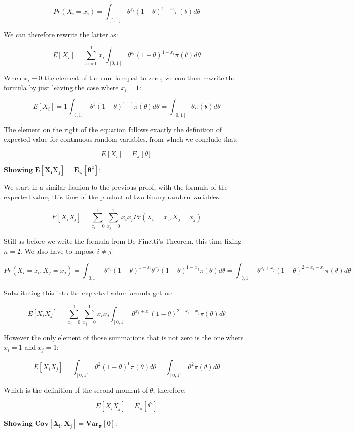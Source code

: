 \documentclass[
]{article}
\begin{document}
\[
Pr(X_i=x_i) = 
\int_{[0,1]} \theta^{x_i}(1 - \theta)^{1 - x_i} \pi(\theta)d\theta
\]

We can therefore rewrite the latter as:

\[
E[X_i] = 
\sum_{x_i=0}^1x_i\int_{[0,1]} \theta^{x_i}(1 - \theta)^{1 - x_i} \pi(\theta)d\theta
\]

When \(x_i = 0\) the element of the sum is equal to zero, we can then
rewrite the formula by just leaving the case where \(x_i = 1\):

\[
E[X_i] = 1\int_{[0,1]} \theta^{1}(1 - \theta)^{1 - 1} \pi(\theta)d\theta
= \int_{[0,1]} \theta \pi(\theta)d\theta
\]

The element on the right of the equation follows exactly the definition
of expected value for continuous random variables, from which we
conclude that:

\[
E[X_i] = E_\pi[\theta]
\]

\(\textbf{Showing } \mathbf{E[X_iX_j]=E_{\pi}[\theta^2]}\):

We start in a similar fashion to the previous proof, with the formula of
the expected value, this time of the product of two binary random
variables:

\[
E[X_iX_j] = 
\sum_{x_i=0}^1\sum_{x_j=0}^1x_ix_jPr(X_i=x_i,X_j=x_j)
\]

Still as before we write the formula from De Finetti's Theorem, this
time fixing \(n = 2\). We also have to impose \(i \neq j\):

\[
Pr(X_i=x_i,X_j=x_j) = \int_{[0,1]} \theta^{x_i}(1 - \theta)^{1 - x_i} \theta^{x_j}(1 - \theta)^{1 - x_j} \pi(\theta)d\theta
= \int_{[0,1]} \theta^{x_i + x_j}(1 - \theta)^{2 - x_i - x_j} \pi(\theta)d\theta
\]

Substituting this into the expected value formula get us:

\[
E[X_iX_j] =
\sum_{x_i=0}^1\sum_{x_j=0}^1x_ix_j\int_{[0,1]} \theta^{x_i + x_j}(1 - \theta)^{2 - x_i - x_j} \pi(\theta)d\theta
\]

However the only element of those summations that is not zero is the one
where \(x_i = 1\) and \(x_j = 1\):

\[
E[X_iX_j] = \int_{[0,1]} \theta^{2}(1 - \theta)^{0} \pi(\theta)d\theta
= \int_{[0,1]} \theta^{2} \pi(\theta)d\theta
\]

Which is the definition of the second moment of \(\theta\), therefore:

\[
E[X_iX_j] = E_\pi[\theta^2]
\]

\(\textbf{Showing } \mathbf{Cov[X_i,X_j]=Var_{\pi}[\theta]}\):
\end{document}
